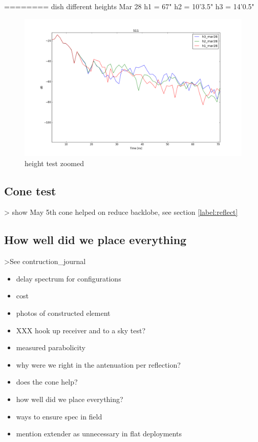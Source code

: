 \documentclass[preprint]{aastex}  %
\begin{document}
========
dish different heights
Mar 28
h1 = 67"
h2 = 10'3.5"
h3 = 14'0.5"

\begin{figure}[H]
	\begin{center}
	\includegraphics[width =\textwidth]{reflectometry_plots/Mar28/height_test_zoom}
	\caption{height test zoomed
\label{Fig:} }
	\end{center}
\end{figure}


\subsection{Cone test}
> show May 5th cone helped on reduce backlobe, see section \ref{label:reflect}

\subsection{How well did we place everything}
>See contruction_journal

\begin{itemize}
\item delay spectrum for configurations
\item cost
\item photos of constructed element
\item XXX hook up receiver and to a sky test?
\item measured parabolicity
\item why were we right in the antenuation per reflection?
\item does the cone help?
\item how well did we place everything?
\item ways to ensure spec in field
\item mention extender as unnecessary in flat deployments
\end{itemize}
\end{document}
